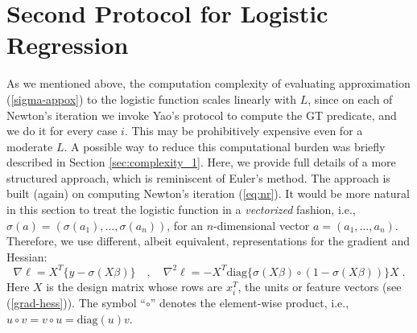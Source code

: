 \documentclass[11pt]{article}
\begin{document}
\section{Second Protocol for Logistic Regression}\label{sec:protocol2}

As we mentioned above, the computation complexity of evaluating  approximation (\ref{sigma-appox}) to the logistic function scales linearly with $L$, since  on each of Newton's iteration we invoke Yao's protocol to compute the GT predicate, and we do it for every case $i$.    This may be prohibitively expensive even for a moderate $L$. A possible way to reduce this computational burden was briefly described in Section \ref{sec:complexity_1}. Here, we provide full details of a more structured approach, which is reminiscent of Euler's method. The approach is built (again) on computing Newton's iteration (\ref{eq:nr}). It would be more natural in this section to treat the logistic function in a {\it vectorized} fashion, i.e., $\sigma(a)=(\sigma(a_1),\ldots, \sigma(a_n))$, for an $n$-dimensional vector $a=(a_1, \ldots, a_n)$. Therefore, we use different, albeit equivalent, representations for the gradient and Hessian:
\begin{equation}
\nabla \ell = X^T\{y-\sigma(X\beta)\} \quad , \quad \nabla^2\ell=-X^T \text{diag}\{\sigma(X\beta)\circ (1-\sigma(X\beta))\}X \; .
\end{equation}
Here $X$ is the design matrix whose rows are $x_i^T$, the units or feature vectors (see (\ref{grad-hess})). The symbol ``$\circ$'' denotes the element-wise product, i.e., $u\circ v=v\circ u=\text{diag}(u)v$.
\end{document}
